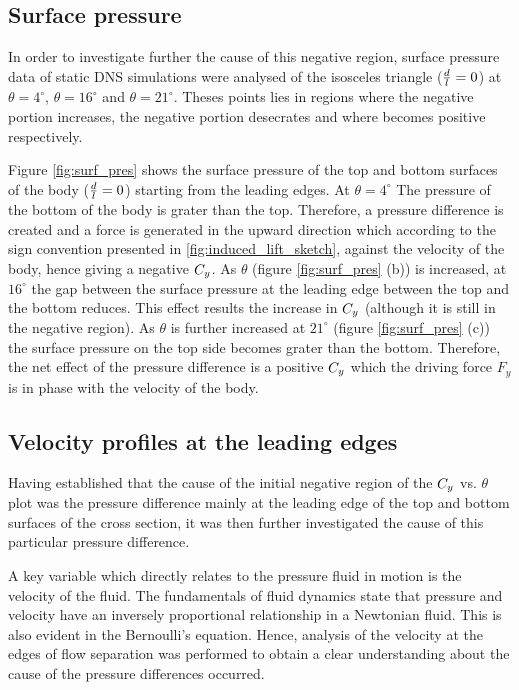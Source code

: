 \subsection{Surface pressure}
  \label{subsec:cross-sec-surface pressure}
  

In order to investigate further the cause of this negative region, surface pressure data of static DNS simulations were analysed of the isosceles triangle ($\frac{d}{l}=0$) at $\theta=4^{\circ}$, $\theta=16^{\circ}$ and $\theta=21^{\circ}$. Theses points lies in regions where the negative portion increases, the negative portion desecrates and where \cy becomes positive respectively.   
  


Figure \ref{fig:surf_pres} shows the surface pressure of the top and bottom surfaces of the body ($\frac{d}{l}=0$) starting from  the leading edges. At $\theta=4^{\circ}$ The pressure of the bottom of the body is grater than the top. Therefore, a pressure difference is created and a force is generated in the upward direction which according to the sign convention presented in \ref{fig:induced_lift_sketch}, against the velocity of the body, hence giving a negative $C_{y}$. As $\theta$ (figure \ref{fig:surf_pres} (b)) is increased, at $16^{\circ}$ the gap between the surface pressure at the leading edge between the top and the bottom reduces. This effect results the increase in $C_{y}$ (although it is still in the negative region). As $\theta$ is further increased at $21^{\circ}$ (figure \ref{fig:surf_pres} (c)) the surface pressure on the top side becomes grater than the bottom. Therefore, the net effect of the pressure difference is a positive $C_{y}$ which the driving force $F_y$ is in phase with the velocity of the body. 

\subsection{Velocity profiles at the leading edges}

Having established that the cause of the initial negative region of the $C_{y}$ vs. $\theta$ plot was the pressure difference mainly at the leading edge of the top and bottom surfaces of the cross section, it was then further investigated the cause of this particular pressure difference.  


A key variable which directly relates to the pressure fluid in motion is the velocity of the fluid. The fundamentals of fluid dynamics state that pressure and velocity have an inversely proportional relationship in a Newtonian fluid. This is also evident in the Bernoulli's equation. Hence, analysis of the velocity at the edges of flow separation was performed to obtain a clear understanding about the cause of the pressure differences occurred.   


